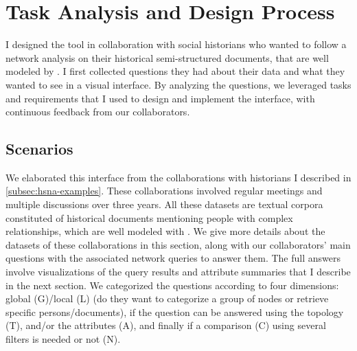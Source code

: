 \section{Task Analysis and Design Process}\label{sec:combinet-tasks}

I designed the \name tool in collaboration with social historians who wanted to follow a network analysis on their historical semi-structured documents, that are well modeled by \modelplural.
I first collected questions they had about their data and what they wanted to see in a visual interface.
By analyzing the questions, we leveraged tasks and requirements that I used to design and implement the interface, with continuous feedback from our collaborators.

\subsection{Scenarios}

We elaborated this interface from the collaborations with historians I described in \autoref{subsec:hsna-examples}.
These collaborations involved regular meetings and multiple discussions over three years.
All these datasets are textual corpora constituted of historical documents mentioning people with complex relationships, which are well modeled with \modelplural.
We give more details about the datasets of these collaborations in this section, along with our collaborators' main questions with the associated network queries to answer them.
The full answers involve visualizations of the query results and attribute summaries that I describe in the next section.
We categorized the questions according to four dimensions: global (G)/local (L) (do they want to categorize a group of nodes or retrieve specific persons/documents), if the question can be answered using the topology (T), and/or the attributes (A), and finally if a comparison (C) using several filters is needed or not (N).

